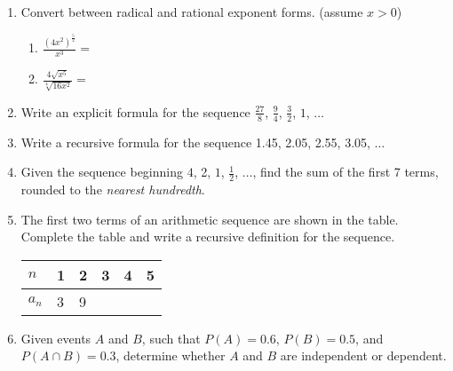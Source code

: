\documentclass[12pt, twoside]{article}
\begin{document}
\begin{enumerate}[itemsep=0.5cm]
\item Convert between radical and rational exponent forms. (assume $x > 0$)
    \begin{multicols}{2}
    \begin{enumerate}
        \item $\displaystyle \frac{(4x^2)^{\frac{5}{2}}}{x^{3}} =$
        \item $\displaystyle \frac{4\sqrt{x^5}}{\sqrt[4]{16x^2}} = $
    \end{enumerate}
    \end{multicols} \vspace{2cm}

\newpage
\item Write an explicit formula for the sequence $\frac{27}{8}$, $\frac{9}{4}$, $\frac{3}{2}$, $1$, $\ldots$ \vspace{3cm}

\item Write a recursive formula for the sequence 1.45, 2.05, 2.55, 3.05, $\ldots$ \vspace{3cm}


\item Given the sequence beginning  $4$, 2, $1$, $\frac{1}{2}$, $\ldots$, find the sum of the first 7 terms, rounded to the \emph{nearest hundredth}. \vspace{3cm}

\item The first two terms of an arithmetic sequence are shown in the table. Complete the table and write a recursive definition for the sequence.
\begin{center}
\begin{tabular}{|p{1cm}|p{1cm}|p{1cm}|p{1cm}|p{1cm}|p{1cm}|}
    \hline
    $n$ & 1 & 2 & 3 & 4 & 5 \\
    \hline
    $a_n$ & 3 & 9 & & & \\[0.25cm]
    \hline
\end{tabular}
\end{center}

\newpage
\item Given events $A$ and $B$, such that $P(A) = 0.6$, $P(B) = 0.5$, and $P(A \cap B) = 0.3$, determine whether $A$ and $B$ are independent or dependent. \vspace{3cm}


\end{enumerate}
\end{document}
